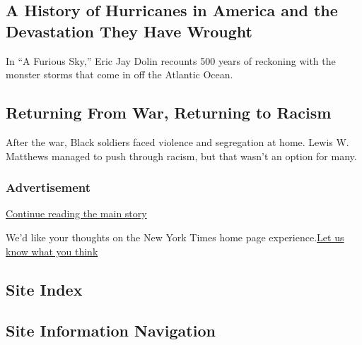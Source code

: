 \hypertarget{a-history-of-hurricanes-in-america-and-the-devastation-they-have-wrought}{%
\subsection{A History of Hurricanes in America and the Devastation They
Have
Wrought}\label{a-history-of-hurricanes-in-america-and-the-devastation-they-have-wrought}}

In ``A Furious Sky,'' Eric Jay Dolin recounts 500 years of reckoning
with the monster storms that come in off the Atlantic Ocean.

\href{/2020/08/04/books/review/a-furious-sky-hurricanes-eric-jay-dolan.html}{}

\href{/2020/07/30/magazine/black-soldiers-wwii-racism.html}{}

\hypertarget{returning-from-war-returning-to-racism}{%
\subsection{Returning From War, Returning to
Racism}\label{returning-from-war-returning-to-racism}}

After the war, Black soldiers faced violence and segregation at home.
Lewis W. Matthews managed to push through racism, but that wasn't an
option for many.

\href{/2020/07/30/magazine/black-soldiers-wwii-racism.html}{}

\hypertarget{advertisement}{%
\subsubsection{Advertisement}\label{advertisement}}

\protect\hyperlink{after-dfp-ad-mid1-large}{Continue reading the main
story}

We'd like your thoughts on the New York Times home page
experience.\href{http://nyt.qualtrics.com/jfe/form/SV_eFJmKj9v0krSE0l}{Let
us know what you think}

\hypertarget{site-index}{%
\subsection{Site Index}\label{site-index}}

\hypertarget{site-information-navigation}{%
\subsection{Site Information
Navigation}\label{site-information-navigation}}

